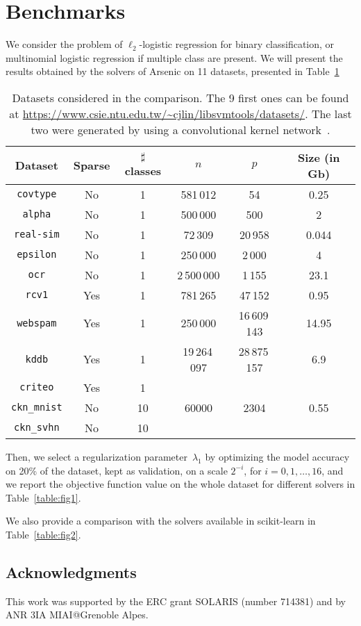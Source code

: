 \documentclass{article}
\begin{document}
\section{Benchmarks}
We consider the problem of $\ell_2$-logistic regression for binary
classification, or multinomial logistic regression if multiple class are
present. We will present the results obtained by the solvers of Arsenic on 11
datasets, presented in Table~\ref{tab:datasets}
\begin{table}[hbtp!]
   \centering
\begin{tabular}{|c|c|c|c|c|c|}
   \hline
   Dataset & Sparse & $\sharp$ classes & $n$ & $p$ & Size (in Gb) \\
   \hline
   \texttt{covtype} & No & 1 & 581\,012 & 54 & 0.25 \\
   \hline
   \texttt{alpha} & No & 1 & 500\,000 & 500 & 2 \\
   \hline
   \texttt{real-sim} & No & 1 & 72\,309 & 20\,958 & 0.044 \\
   \hline
   \texttt{epsilon} & No & 1 & 250\,000 & 2\,000 & 4 \\
   \hline
   \texttt{ocr} & No & 1 & 2\,500\,000 & 1\,155 & 23.1 \\
   \hline
   \texttt{rcv1} & Yes & 1 & 781\,265 & 47\,152 & 0.95 \\
   \hline
   \texttt{webspam} & Yes & 1 & 250\,000 & 16\,609\,143  & 14.95  \\
   \hline
   \texttt{kddb} & Yes & 1 & 19\,264\,097 & 28\,875\,157 & 6.9 \\
   \hline
   \texttt{criteo} & Yes & 1 &  &  &  \\
   \hline
   \texttt{ckn\_mnist} & No & 10 & 60000 & 2304 & 0.55 \\
   \hline
   \texttt{ckn\_svhn} & No & 10 &  &  &  \\
   \hline
\end{tabular} \caption{Datasets considered in the comparison. The 9 first ones can be found at \url{https://www.csie.ntu.edu.tw/~cjlin/libsvmtools/datasets/}. The last two were generated by using a convolutional kernel network~\cite{mairal2016end}. } \label{tab:datasets}
\end{table}

Then, we select a regularization parameter~$\lambda_1$ by optimizing the model
accuracy on 20\% of the dataset, kept as validation, on a scale $2^{-i}$, for $i=0,1,\ldots,16$,
and we report the objective function value on the whole dataset for different solvers in Table~\ref{table:fig1}.

We also provide a comparison with the solvers available in scikit-learn in Table~\ref{table:fig2}.


\subsection*{Acknowledgments}
This work was supported by the ERC grant SOLARIS (number 714381) and by ANR 3IA MIAI@Grenoble Alpes.



\end{document}
